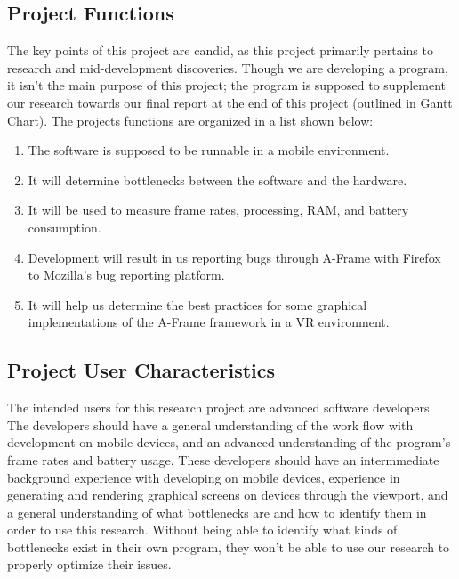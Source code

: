 \documentclass[letterpaper,10pt,titlepage,draftclsnofoot,onecolumn,compsoc,utf8,latin1]{IEEEtran}
\begin{document}
\subsection{Project Functions}
\begin{singlespace}
\noindent
The key points of this project are candid, as this project primarily pertains to research and mid-development discoveries. Though we are developing a program, it isn't the main purpose of this project; the program is supposed to supplement our research towards our final report at the end of this project (outlined in Gantt Chart). The projects functions are organized in a list shown below:\\
\begin{enumerate}[labelsep=2em,leftmargin=.5in]
    \item The software is supposed to be runnable in a mobile environment. 
    \item It will determine bottlenecks between the software and the hardware.
    \item It will be used to measure frame rates, processing, RAM, and battery consumption.
    \item Development will result in us reporting bugs through A-Frame with Firefox to Mozilla's bug reporting platform.
    \item It will help us determine the best practices for some graphical implementations of the A-Frame framework in a VR environment.
\end{enumerate}
\end{singlespace}

\subsection{Project User Characteristics}
\begin{singlespace}
\noindent
The intended users for this research project are advanced software developers. The developers should have a general understanding of the work flow with development on mobile devices, and an advanced understanding of the program's frame rates and battery usage. These developers should have an intermmediate background experience with developing on mobile devices, experience in generating and rendering graphical screens on devices through the viewport, and a general understanding of what bottlenecks are and how to identify them in order to use this research. Without being able to identify what kinds of bottlenecks exist in their own program, they won't be able to use our research to properly optimize their issues.
\end{singlespace}
\end{document}
